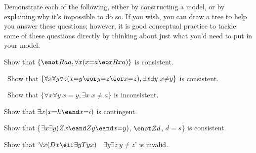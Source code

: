 \solutions
\problempart Demonstrate each of the following, either by constructing a model, or by explaining why it's impossible to do so. If you wish, you can draw a tree to help you answer these questions; however, it is good conceptual practice to tackle some of these questions directly by thinking about just what you'd need to put in your model.
\label{pr.IdentityModels}
\begin{earg}
\item Show that $\{{\enot}Raa, \forall x (x{=}a \eor Rxa)\}$
is consistent.
\item\ Show that $\{\forall x\forall y\forall z(x{=}y \eor y{=}z \eor x{=}z),
\exists x\exists y\ x{\neq} y\}$ is consistent.
\item\ Show that $\{\forall x\forall y\ x{=}y, \exists x\ x {\neq} a\}$ is inconsistent.
\item Show that $\exists x (x {=} h \eand x {=} i)$ is contingent.
\item Show that \{$\exists x\exists y(Zx \eand Zy \eand x{=}y)$, $\enot Zd$, $d{=}s$\} is consistent.
\item Show that `$\forall x(Dx \eif \exists y Tyx)$ \therefore\ $\exists y \exists z\ y{\neq} z$' is invalid.
\end{earg}

